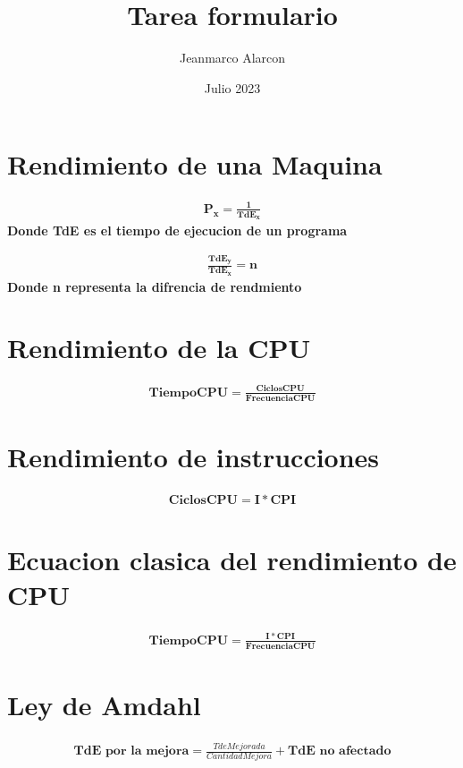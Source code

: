 \documentclass {article}
\title{Tarea formulario}
\author{Jeanmarco Alarcon}
\date{Julio 2023}
\begin{document}
\maketitle
    \section{Rendimiento de una Maquina}                   
        \begin{gather*}
            \mathbf{ P_{x} =\frac{1}{TdE_{x}} }
        \end{gather*}
        \textbf{Donde TdE es el tiempo de ejecucion de un programa} 
        
        \begin{gather}
            \mathbf{\frac{TdE_{y}}{TdE_{x}}=n}
        \end{gather}
        \textbf{Donde n representa la difrencia de rendmiento} 

    \section{Rendimiento de la CPU}

        \begin{gather}
            \mathbf{Tiempo CPU=\frac{Ciclos CPU}{Frecuencia CPU} }
        \end{gather}
    \section{Rendimiento de instrucciones}  

        \begin{gather}
            \mathbf{Ciclos CPU=I*CPI}
        \end{gather}
        
    \section{Ecuacion clasica del rendimiento de CPU} 
        \begin{gather}
            \mathbf{TiempoCPU=\frac{I*CPI}{FrecuenciaCPU}}
        \end{gather}

    \section{Ley de Amdahl} 
        
        \begin{gather}
            \textbf{TdE por la mejora}=\frac{TdeMejorada}{CantidadMejora}+\textbf{TdE no afectado}
        \end{gather}
        
\end{document}
